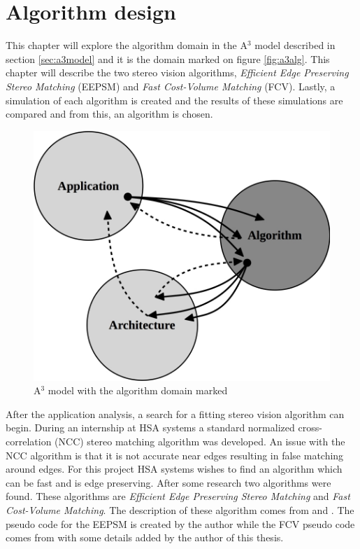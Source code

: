\chapter{Algorithm design} \label{ch:alganalysis}
This chapter will explore the algorithm domain in the A$^3$ model described in section \vref{sec:a3model} and it is the domain marked on figure \vref{fig:a3alg}. This chapter will describe the two stereo vision algorithms, \textit{Efficient Edge Preserving Stereo Matching} (EEPSM) and \textit{Fast Cost-Volume Matching} (FCV). Lastly, a simulation of each algorithm is created and the results of these simulations are compared and from this, an algorithm is chosen.\\

\begin{figure}[ht!]
  \centering
  \includegraphics[scale=0.25]{figures/a3alg}
  \caption{A$^3$ model with the algorithm domain marked}
  \label{fig:a3alg}
\end{figure}

After the application analysis, a search for a fitting stereo vision algorithm can begin. During an internship at HSA systems a standard normalized cross-correlation (NCC) stereo matching algorithm was developed. An issue with the NCC algorithm is that it is not accurate near edges resulting in false matching around edges. For this project HSA systems wishes to find an algorithm which can be fast and is edge preserving. After some research two algorithms were found. These algorithms are \textit{Efficient Edge Preserving Stereo Matching} and \textit{Fast Cost-Volume Matching}. The description of these algorithm comes from \cite{cciugla2011efficient} and \cite{hosni2013fast}. The pseudo code for the EEPSM is created by the author while the FCV pseudo code comes from \cite{he2013guided} with some details added by the author of this thesis.
